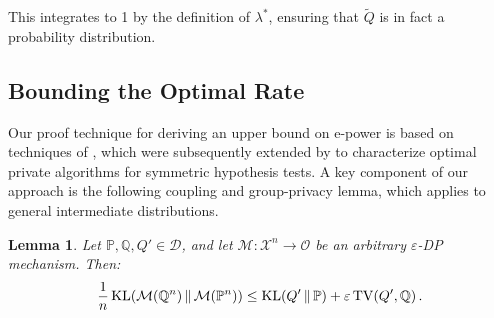 \documentclass{article}
\DeclareMathOperator{\KLop}{KL}
\newcommand{\KL}[2]{%
  \mathchoice
    {\KLop\!\left(#1\,\middle\|\,#2\right)}%
    {\KLop(#1\,\Vert\,#2)}%
    {\KLop(#1\,\Vert\,#2)}%
    {\KLop(#1\,\Vert\,#2)}%
}
\DeclareMathOperator{\TVop}{TV}
\newcommand{\TV}[2]{
  \mathchoice
    {\TVop\!\left(#1,#2\right)}%
    {\TVop(#1,#2)}%
    {\TVop(#1,#2)}%
    {\TVop(#1,#2)}%
}
\newcommand{\Null}{\mathbb{P}}
\newcommand{\E}{\mathbb{E}}
\newcommand{\Alt}{\mathbb{Q}}
\newcommand{\M}{\mathcal{M}}
\newcommand{\eps}{\varepsilon}
\newtheorem{lemma}{Lemma}[theorem]
\begin{document}
This integrates to 1 by the definition of $\lambda^*$, ensuring that $\widetilde Q$ is in fact a probability distribution. 

\subsection{Bounding the Optimal Rate}
\label{sec:batch_rate_upper}

Our proof technique for deriving an upper bound on e-power is based on techniques of \citet{balle2018privacyamplificationsubsamplingtight}, which were subsequently extended by \citet{canonne2019structure} to characterize optimal private algorithms for symmetric hypothesis tests.  
A key component of our approach is the following coupling and group-privacy lemma, which applies to general intermediate distributions.
\begin{lemma}\label{lem:decomp}
    Let $\Null, \Alt, Q' \in \mathcal{D}$, and let $\M: \mathcal{X}^n \to \mathcal{O}$ be an arbitrary $\eps$-DP mechanism. Then:
    \begin{equation*}
        \frac{1}{n}\KL{\M(\Alt^n)}{\M(\Null^n)} \leq \KL{Q'}{\Null} + \varepsilon \TV{Q'}{\Alt}.
    \end{equation*}
\end{lemma}
\end{document}
